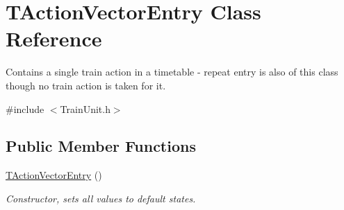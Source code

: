 \hypertarget{class_t_action_vector_entry}{}\section{T\+Action\+Vector\+Entry Class Reference}
\label{class_t_action_vector_entry}


Contains a single train action in a timetable -\/ repeat entry is also of this class though no train action is taken for it.  




{\ttfamily \#include $<$Train\+Unit.\+h$>$}

\subsection*{Public Member Functions}
\begin{DoxyCompactItemize}
\item 
\mbox{\label{class_t_action_vector_entry_a2f3969c630acb3f7a346ced7a601502f}} 
\mbox{\hyperlink{class_t_action_vector_entry_a2f3969c630acb3f7a346ced7a601502f}{T\+Action\+Vector\+Entry}} ()
\begin{DoxyCompactList}\small\item\em Constructor, sets all values to default states. \end{DoxyCompactList}\end{DoxyCompactItemize}
